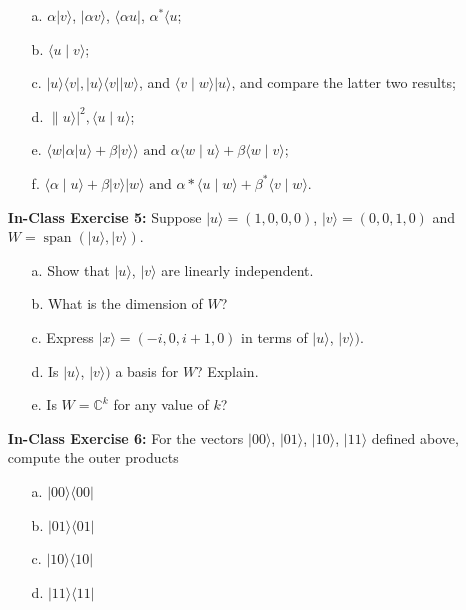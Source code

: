 \documentclass[main.tex]{subfiles}
\begin{document}
\begin{enumerate}
    \begin{enumerate}
        \item[a.] $\alpha|v\rangle$, $|\alpha v\rangle$, $\langle\alpha u|$, $\alpha^{*}\langle u$;
        \item[b.] $\langle u \mid v\rangle$;
        \item[c.] $|u\rangle\langle v|,| u\rangle\langle v|| w\rangle$, and $\langle v \mid w\rangle|u\rangle$, and compare the latter two results;
        \item[d.] $\| u\rangle\left.\right|^{2},\langle u \mid u\rangle$;
        \item[e.] $\langle w|\alpha| u\rangle+\beta|v\rangle\rangle \text { and } \alpha\langle w \mid u\rangle+\beta\langle w \mid v\rangle$;
        \item[f.] $\langle\alpha \mid u\rangle+\beta|v\rangle|w\rangle \text { and } \alpha *\langle u \mid w\rangle+\beta^{*}\langle v \mid w\rangle$.
    \end{enumerate}

\item[] \textbf{In-Class Exercise 5:} Suppose $|u\rangle=(1,0,0,0)$, $|v\rangle=(0,0,1,0)$ and $W=\operatorname{span}(|u\rangle,|v\rangle)$.

    \begin{enumerate}
        \item[a.] Show that $|u\rangle$, $|v\rangle$ are linearly independent.
        \item[b.] What is the dimension of $W$?
        \item[c.] Express $|x\rangle=(-i, 0, i+1,0)$ in terms of $|u\rangle$, $|v\rangle)$.
        \item[d.] Is $|u\rangle$, $|v\rangle)$ a basis for $W$? Explain.
        \item[e.] Is $W=\mathbb{C}^{k}$ for any value of $k$?
    \end{enumerate}

\item[] \textbf{In-Class Exercise 6:} For the vectors $|00\rangle$, $|01\rangle$, $|10\rangle$, $|11\rangle$ defined above, compute the outer products

    \begin{enumerate}
        \item[a.] $|00\rangle\langle 00|$
        \item[b.] $|01\rangle\langle 01|$
        \item[c.] $|10\rangle\langle 10|$
        \item[d.] $|11\rangle\langle 11|$
    \end{enumerate}


\end{enumerate}
\end{document}
